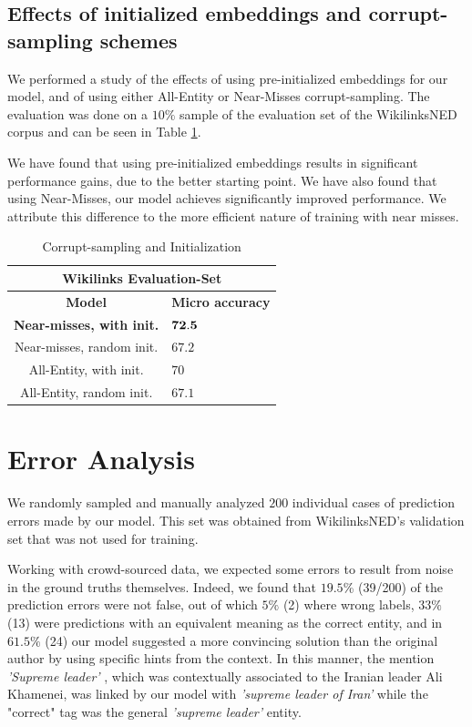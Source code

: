 \documentclass[11pt]{article}
\begin{document}
	\subsection{Effects of initialized embeddings and corrupt-sampling schemes}
	\label{experiments:effect}
	
	We performed a study of the effects of using pre-initialized embeddings for our model, and of using either All-Entity or Near-Misses corrupt-sampling. The evaluation was done on a $10\%$ sample of the evaluation set of the WikilinksNED corpus and can be seen in Table \ref{tab:c}. 
	
	We have found that using pre-initialized embeddings results in significant performance gains, due to the better starting point. We have also found that using Near-Misses, our model achieves significantly improved performance. We attribute this difference to the more efficient nature of training with near misses.
	
	
	\begin{table}[ht]
		\begin{center}
			\begin{tabular}{|c| p{1.5cm}|}
				\hline \multicolumn{2}{|c|}{Wikilinks Evaluation-Set} \\
				\hline \bf Model & \bf Micro     accuracy  \\ \hline
				\bf Near-misses, with init. &  $\bf 72.5$ \\ 
				Near-misses, random init. & $67.2$ \\ 
				All-Entity, with init. & $70$ \\ 
				All-Entity, random init. & $67.1$ \\ 
				\hline
			\end{tabular}
		\end{center}
		\caption{\label{tab:c} Corrupt-sampling and Initialization}
	\end{table}
	
	
	\section{Error Analysis}
	
	We randomly sampled and manually analyzed $200$ individual cases of prediction errors made by our model. This set was obtained from WikilinksNED's validation set that was not used for training. 
	
	Working with crowd-sourced data, we expected some errors to result from noise in the ground truths themselves. Indeed, we found that $19.5$\% (39/200) of the prediction errors were not false, out of which $5\%$ (2) where wrong labels, $33\%$ (13) were predictions with an equivalent meaning as the correct entity, and in $61.5\%$ (24) our model suggested a more convincing solution than the original author by using specific hints from the context. In this manner, the  mention \textit{'Supreme leader'} , which was contextually associated to the Iranian leader Ali Khamenei, was linked by our model with \textit{'supreme leader of Iran'} while the "correct" tag was the general \textit{'supreme leader'} entity.
	
\end{document}
